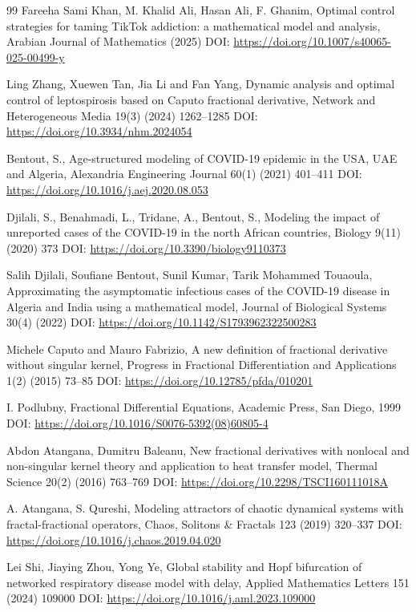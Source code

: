 \documentclass[10pt]{NSP1}
\begin{document}
\begin{thebibliography}{99}
Fareeha Sami Khan, M. Khalid Ali, Hasan Ali, F. Ghanim, Optimal control strategies for taming TikTok addiction: a mathematical model and analysis, Arabian Journal of Mathematics (2025) DOI: \url{https://doi.org/10.1007/s40065-025-00499-y}

Ling Zhang, Xuewen Tan, Jia Li and Fan Yang, Dynamic analysis and optimal control of leptospirosis based on Caputo fractional derivative, Network and Heterogeneous Media 19(3) (2024) 1262–1285 DOI: \url{https://doi.org/10.3934/nhm.2024054}

Bentout, S., Age-structured modeling of COVID-19 epidemic in the USA, UAE and Algeria, Alexandria Engineering Journal 60(1) (2021) 401–411 DOI: \url{https://doi.org/10.1016/j.aej.2020.08.053}

Djilali, S., Benahmadi, L., Tridane, A., Bentout, S., Modeling the impact of unreported cases of the COVID-19 in the north African countries, Biology 9(11) (2020) 373 DOI: \url{https://doi.org/10.3390/biology9110373}

Salih Djilali, Soufiane Bentout, Sunil Kumar, Tarik Mohammed Touaoula, Approximating the asymptomatic infectious cases of the COVID-19 disease in Algeria and India using a mathematical model, Journal of Biological Systems 30(4) (2022) DOI: \url{https://doi.org/10.1142/S1793962322500283}

Michele Caputo and Mauro Fabrizio, A new definition of fractional derivative without singular kernel, Progress in Fractional Differentiation and Applications 1(2) (2015) 73--85 DOI: \url{https://doi.org/10.12785/pfda/010201}

I. Podlubny, Fractional Differential Equations, Academic Press, San Diego, 1999 DOI: \url{https://doi.org/10.1016/S0076-5392(08)60805-4}

Abdon Atangana, Dumitru Baleanu, New fractional derivatives with nonlocal and non-singular kernel theory and application to heat transfer model, Thermal Science 20(2) (2016) 763--769 DOI: \url{https://doi.org/10.2298/TSCI160111018A}

A. Atangana, S. Qureshi, Modeling attractors of chaotic dynamical systems with fractal-fractional operators, Chaos, Solitons \& Fractals 123 (2019) 320--337 DOI: \url{https://doi.org/10.1016/j.chaos.2019.04.020}

Lei Shi, Jiaying Zhou, Yong Ye, Global stability and Hopf bifurcation of networked respiratory disease model with delay, Applied Mathematics Letters 151 (2024) 109000 DOI: \url{https://doi.org/10.1016/j.aml.2023.109000}


\end{thebibliography}
\end{document}

